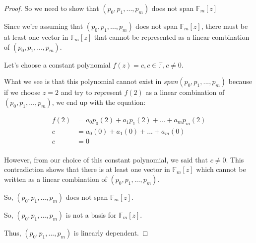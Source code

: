 \documentclass[12pt,letterpaper]{article}
\begin{document}
\begin{enumerate}
\begin{proof}
        So we need to show that $(p_0, p_1, ..., p_m)$ does not span $\mathbb{F}_m[z]$

        Since we're assuming that $(p_0, p_1, ..., p_m)$ does not span $\mathbb{F}_m[z]$,
        there must be at least one vector in $\mathbb{F}_m[z]$
        that cannot be represented as a linear combination of $(p_0, p_1, ..., p_m)$.

        Let's choose a constant polynomial $f(z) = c, c \in \mathbb{F}, c \neq 0$.

        What we see is that this polynomial cannot exist in $span(p_0, p_1, ..., p_m)$
        because if we choose $z = 2$
        and try to represent $f(2)$ as a linear combination of $(p_0, p_1, ..., p_m)$,
        we end up with the equation:

        \begin{align*}
          f(2) &= a_0p_0(2) + a_1p_1(2) + ... + a_mp_m(2) \\
          c &= a_0(0) + a_1(0) + ... + a_m(0) \\
          c &= 0 \\
        \end{align*}

        However, from our choice of this constant polynomial, we said that $c \neq 0$.
        This contradiction shows that there is at least one vector in $\mathbb{F}_m[z]$ which cannot be written as a linear combination of $(p_0, p_1, ..., p_m)$.
        
        So, $(p_0, p_1, ..., p_m)$ does not span $\mathbb{F}_m[z]$.

        So, $(p_0, p_1, ..., p_m)$ is not a basis for $\mathbb{F}_m[z]$.

        Thus, $(p_0, p_1, ..., p_m)$ is linearly dependent.
      \end{proof}
  \end{enumerate}
\end{document}
